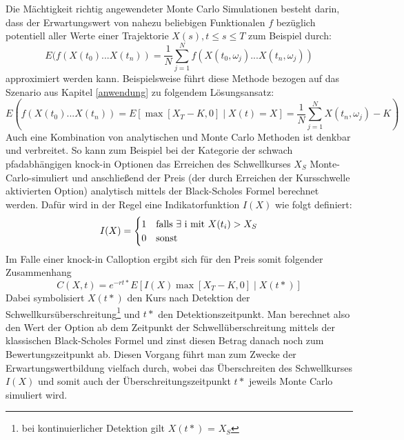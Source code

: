 \documentclass[12pt,a4paper,headsepline,bibliography=totoc,listof=totoc,headinclude=false,footinclude=false,BCOR5mm]{scrreprt} %
\begin{document}
Die M\"achtigkeit richtig angewendeter Monte Carlo Simulationen besteht darin, dass der Erwartungswert von nahezu beliebigen Funktionalen $f$ bez\"uglich potentiell aller Werte einer Trajektorie $X(s), t \leq s \leq T$ zum Beispiel durch:
   \begin{equation} \label{ewert}
E(f(X(t_{0}) ... X(t_{n})) =  \frac{1}{N} \sum_{j=1}^{N} f(X(t_0,\omega_j) ... X(t_n,\omega_j)) \end{equation}
approximiert werden kann. Beispielsweise f\"uhrt diese Methode bezogen auf das Szenario aus Kapitel \ref{anwendung}  zu folgendem L\"osungsansatz:
   \begin{equation} \label{bsp}
E(f(X(t_{0}) ... X(t_{n})) = E\left [\max[X_{T}-K,0] \mid X(t) = X \right ] =  \frac{1}{N} \sum_{j=1}^{N} X(t_n,\omega_j) - K) \end{equation}
 Auch eine Kombination von analytischen und Monte Carlo Methoden ist denkbar und verbreitet. So kann zum Beispiel bei der Kategorie der schwach pfadabh\"angigen knock-in Optionen das Erreichen des Schwellkurses $X_S$ Monte-Carlo-simuliert und anschlie{\ss}end der Preis (der durch Erreichen der Kursschwelle aktivierten Option) analytisch mittels der Black-Scholes Formel \cite[S. 447]{Brandimarte2006} \cite{Broadie97} berechnet werden. Daf\"ur wird in der Regel eine Indikatorfunktion $I(X)$ wie folgt definiert:
\begin{equation} \label{indi}
I(X)=\begin{cases} 1 & \text{falls  $\exists$ i \text{mit} $X(t_i) > X_S$} \\ 0 & \text{sonst}\end{cases} 
\end{equation}
Im Falle einer knock-in Calloption ergibt sich f\"ur den Preis somit folgender Zusammenhang
\begin{equation} \label{indi}
C(X,t) =e^{-rt*}  E \left [I(X)\max[X_{T}-K,0] \mid  X(t*) \right ]  
\end{equation}
Dabei symbolisiert $X(t*)$ den Kurs nach Detektion der Schwellkurs\"uberschreitung\footnote{bei kontinuierlicher Detektion gilt $X(t*)$ = $X_S$} und $t*$ den Detektionszeitpunkt. Man berechnet also den Wert der Option ab dem Zeitpunkt der Schwell\"uberschreitung mittels der klassischen Black-Scholes Formel und zinst diesen Betrag danach noch zum Bewertungszeitpunkt ab. Diesen Vorgang f\"uhrt man zum Zwecke der Erwartungswertbildung vielfach durch, wobei das \"Uberschreiten des Schwellkurses $I(X)$ und somit auch der \"Uberschreitungszeitpunkt $t*$ jeweils Monte Carlo simuliert wird.
\end{document}
